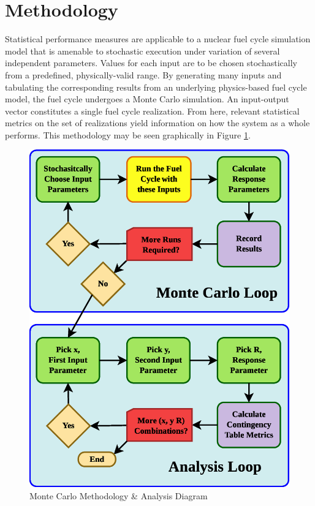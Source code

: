 \section{Methodology}
\label{cts_sec:methodology}

Statistical performance measures are applicable to a nuclear fuel cycle simulation model that
is amenable to stochastic execution under variation of several independent parameters.  Values
for each input are to be chosen stochastically from a predefined, physically-valid range.
By generating many inputs and tabulating the corresponding results from an underlying physics-based
fuel cycle model, the fuel cycle undergoes a Monte Carlo simulation.  An input-output vector
constitutes a single fuel cycle realization.  From here, relevant statistical metrics on the set of
realizations yield information on how the system as a whole performs.  This methodology may be seen
graphically in Figure \ref{mcmethod}.

\begin{figure}[htbp]
\begin{center}
\includegraphics[scale=0.70]{ct_sensitivity/figs/MonteCarloMethodology.eps}
\caption{Monte Carlo Methodology \& Analysis Diagram}
\label{mcmethod}
\end{center}
\end{figure}


